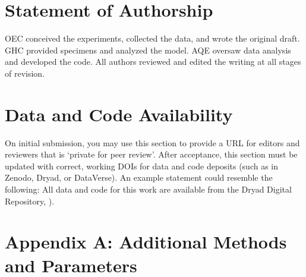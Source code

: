 ﻿\documentclass[11pt]{article}
\begin{document}
\section*{Statement of Authorship}

OEC conceived the experiments, collected the data, and wrote the original draft.
GHC provided specimens and analyzed the model.
AQE oversaw data analysis and developed the code. 
All authors reviewed and edited the writing at all stages of revision.

\section*{Data and Code Availability}

On initial submission, you may use this section to provide a URL for editors and reviewers that is `private for peer review'. After acceptance, this section must be updated with correct, working DOIs for data and code deposits (such as in Zenodo, Dryad, or DataVerse). An example statement could resemble the following: All data and code for this work are available from the Dryad Digital Repository, \citealt{CookEtAl2015}). 

\section*{Appendix A: Additional Methods and Parameters}

%
% 
%
%
%
%
\end{document}

